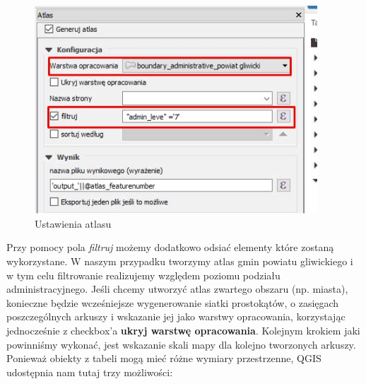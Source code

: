\documentclass[12pt,a4paper]{book}
\begin{document}
\begin{center}
\begin{figure}
\caption{Ustawienia atlasu}
\includegraphics[width=10.597cm,height=7.786cm]{008-atlas.png}
\end{figure}
\end{center}
Przy pomocy pola \textit{filtruj} możemy dodatkowo odsiać elementy które zostaną wykorzystane. W naszym przypadku tworzymy atlas gmin powiatu gliwickiego i w tym celu filtrowanie realizujemy względem poziomu podziału administracyjnego. Jeśli chcemy utworzyć atlas zwartego obszaru (np. miasta), konieczne będzie wcześniejsze wygenerowanie siatki prostokątów, o zasięgach poszczególnych arkuszy i wskazanie jej jako warstwy opracowania, korzystając jednocześnie z checkbox'a \textbf{ukryj warstwę opracowania}. Kolejnym krokiem jaki powinniśmy wykonać, jest wskazanie skali mapy dla kolejno tworzonych arkuszy. Ponieważ obiekty z tabeli mogą mieć różne wymiary przestrzenne, QGIS udostępnia nam tutaj trzy możliwości:
\end{document}
